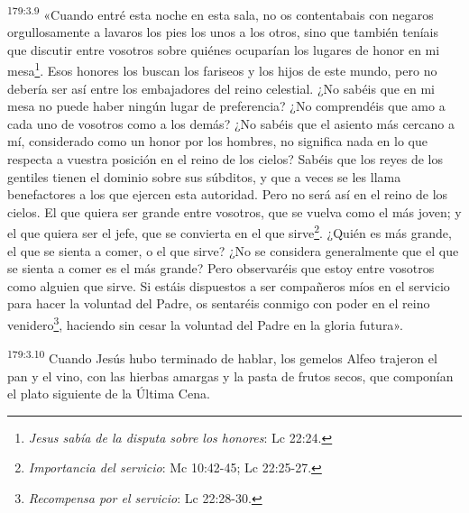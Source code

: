 \par 
\textsuperscript{179:3.9} «Cuando entré esta noche en esta sala, no os contentabais con negaros orgullosamente a lavaros los pies los unos a los otros, sino que también teníais que discutir entre vosotros sobre quiénes ocuparían los lugares de honor en mi mesa\footnote{\textit{Jesus sabía de la disputa sobre los honores}: Lc 22:24.}. Esos honores los buscan los fariseos y los hijos de este mundo, pero no debería ser así entre los embajadores del reino celestial. ¿No sabéis que en mi mesa no puede haber ningún lugar de preferencia? ¿No comprendéis que amo a cada uno de vosotros como a los demás? ¿No sabéis que el asiento más cercano a mí, considerado como un honor por los hombres, no significa nada en lo que respecta a vuestra posición en el reino de los cielos? Sabéis que los reyes de los gentiles tienen el dominio sobre sus súbditos, y que a veces se les llama benefactores a los que ejercen esta autoridad. Pero no será así en el reino de los cielos. El que quiera ser grande entre vosotros, que se vuelva como el más joven; y el que quiera ser el jefe, que se convierta en el que sirve\footnote{\textit{Importancia del servicio}: Mc 10:42-45; Lc 22:25-27.}. ¿Quién es más grande, el que se sienta a comer, o el que sirve? ¿No se considera generalmente que el que se sienta a comer es el más grande? Pero observaréis que estoy entre vosotros como alguien que sirve. Si estáis dispuestos a ser compañeros míos en el servicio para hacer la voluntad del Padre, os sentaréis conmigo con poder en el reino venidero\footnote{\textit{Recompensa por el servicio}: Lc 22:28-30.}, haciendo sin cesar la voluntad del Padre en la gloria futura».

\par 
\textsuperscript{179:3.10} Cuando Jesús hubo terminado de hablar, los gemelos Alfeo trajeron el pan y el vino, con las hierbas amargas y la pasta de frutos secos, que componían el plato siguiente de la
Última Cena.

